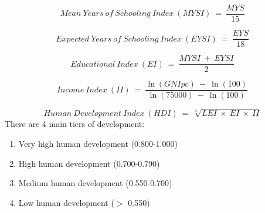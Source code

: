 \documentclass[11pt, a4paper]{article}
\begin{document}
		\begin{equation}
			Mean \ Years \ of \ Schooling \ Index \ (MYSI) \ = \ \frac{MYS}{15}
		\end{equation}

		\begin{equation}
			Expected \ Years \ of \ Schooling \ Index \ (EYSI) \ = \ \frac{EYS}{18}
		\end{equation}

		\begin{equation}
			Educational \ Index \ (EI) \ = \ \frac{MYSI \ + \ EYSI}{2}
		\end{equation}

		\begin{equation}
			Income \ Index \ (II) \ = \ \frac{\ln(GNIpc) \ - \ \ln(100)}{\ln(75000) \ - \ \ln(100)}
		\end{equation}

		\begin{equation}
			Human \ Development \ Index \ (HDI) \ = \ \sqrt[3]{LEI \ \times \ EI \ \times \ II}
		\end{equation}
		\doublespacing
		There are 4 main tiers of development:

		\vspace*{-3mm}
		\singlespacing
		\begin{enumerate}
			\item Very high human development (0.800-1.000)
			\item High human development (0.700-0.790)
			\item Medium human development (0.550-0.700)
			\item Low human development ($>$ 0.550)
		\end{enumerate}
		\doublespacing
		\vspace*{-3mm}

		\vspace*{-6mm}
\end{document}
